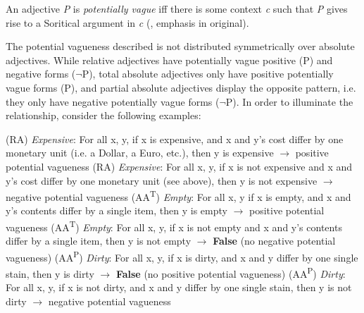 \documentclass[output=paper]{langsci/langscibook}
\begin{document}
\ea
	An adjective \textit{P} is \textit{potentially vague} iff there is some context \textit{c} such that \textit{P} gives rise to a Soritical argument in \textit{c} (\textcite[50]{Burnett2017}, emphasis in original). %
\z

The potential vagueness described is not distributed symmetrically over absolute adjectives. While relative adjectives have potentially vague positive (P) and negative forms ($\neg$P), total absolute adjectives only have positive potentially vague forms (P), and partial absolute adjectives display the opposite pattern, i.e. they only have negative potentially vague forms ($\neg$P). In order to illuminate the relationship, consider the following examples: %

\ea
	(RA) \textit{Expensive}: For all x, y, if x is expensive, and x and y's cost differ by one monetary unit (i.e. a Dollar, a Euro, etc.), then y is expensive {$\rightarrow$ \0} positive potential vagueness
	\z
	\ea
	(RA) \textit{Expensive}: For all x, y, if x is not expensive and x and y's cost differ by one monetary unit (see above), then y is not expensive {$\rightarrow$ \0} negative potential vagueness
	\z
	\ea
	(AA\textsuperscript{T}) \textit{Empty}: For all x, y if x is empty, and x and y's contents differ by a single item, then y is empty {$\rightarrow$ \0} positive potential vagueness
	\z
	\ea
	(AA\textsuperscript{T}) \textit{Empty}: For all x, y, if x is not empty and x and y's contents differ by a single item, then y is not empty {$\rightarrow$ \0} \textbf{False} (no negative potential vagueness)
	\z
	\ea
	(AA\textsuperscript{P}) \textit{Dirty}: For all x, y, if x is dirty, and x and y differ by one single stain, then y is dirty {$\rightarrow$ \0} \textbf{False} (no positive potential vagueness)
	\z
	\ea
	(AA\textsuperscript{P}) \textit{Dirty}: For all x, y, if x is not dirty, and x and y differ by one single stain, then y is not dirty {$\rightarrow$ \0} negative potential vagueness
	\z
\end{document}
